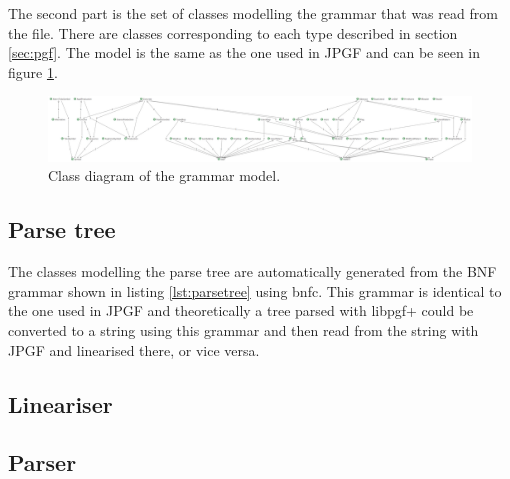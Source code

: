 The second part is the set of classes modelling the grammar that was read from the file. There are classes corresponding to each type described in section \ref{sec:pgf}. The model is the same as the one used in JPGF and can be seen in figure \ref{fig:grammarmodel}.

\begin{figure}[htb]
\centering
\includegraphics[width=\textheight,angle=90]{fig/grammarmodel}
\caption{Class diagram of the grammar model.}
\label{fig:grammarmodel}
\end{figure}


\subsection{Parse tree}
The classes modelling the parse tree are automatically generated from the BNF grammar shown in listing \ref{lst:parsetree} using bnfc. This grammar is identical to the one used in JPGF and theoretically a tree parsed with libpgf+ could be converted to a string using this grammar and then read from the string with JPGF and linearised there, or vice versa.



\subsection{Lineariser}
\subsection{Parser}
